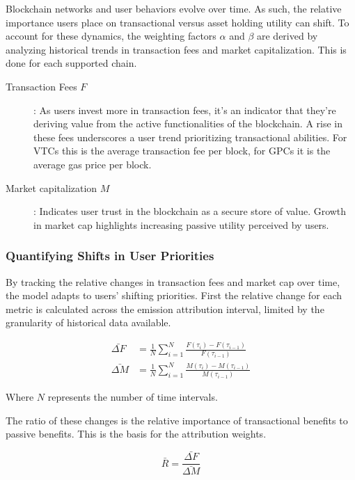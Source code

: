 \documentclass[11pt]{report}
\begin{document}
Blockchain networks and user behaviors evolve over time. As such, the relative importance users place on transactional versus asset holding utility can shift. To account for these dynamics, the weighting factors $\alpha$ and $\beta$ are derived by analyzing historical trends in transaction fees and market capitalization. This is done for each supported chain.

\begin{description}
    \item[Transaction Fees $F$]: As users invest more in transaction fees, it's an indicator that they're deriving value from the active functionalities of the blockchain. A rise in these fees underscores a user trend prioritizing transactional abilities. For \ac{VTC}s this is the average transaction fee per block, for \ac{GPC}s it is the average gas price per block.
    \item[Market capitalization $M$]: Indicates user trust in the blockchain as a secure store of value. Growth in market cap highlights increasing passive utility perceived by users.
\end{description}

\subsubsection{Quantifying Shifts in User Priorities}

By tracking the relative changes in transaction fees and market cap over time, the model adapts to users' shifting priorities. First the relative change for each metric is calculated across the emission attribution interval, limited by the granularity of historical data available.

\begin{align}
    \bar{\Delta F} & = \frac{1}{N}\sum_{i=1}^{N}\frac{F(\tau_i) - F(\tau_{i-1})}{F(\tau_{i-1})} \\
    \bar{\Delta M} & = \frac{1}{N}\sum_{i=1}^{N}\frac{M(\tau_i) - M(\tau_{i-1})}{M(\tau_{i-1})}
\end{align}



Where \( N \) represents the number of time intervals.

The ratio of these changes is the relative importance of transactional benefits to passive benefits. This is the basis for the attribution weights.

\begin{equation} \label{eq:weights_ratio}
    \bar{R} = \frac{\bar{\Delta F}}{\bar{\Delta M}}
\end{equation}
\end{document}
